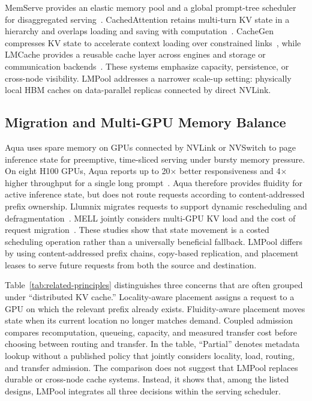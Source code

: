 \documentclass{article}
\newcommand{\sys}{LMPool}
\begin{document}
MemServe provides an elastic memory pool and a global prompt-tree scheduler for disaggregated serving~\citep{MemServe}. CachedAttention retains multi-turn KV state in a hierarchy and overlaps loading and saving with computation~\citep{CachedAttention}. CacheGen compresses KV state to accelerate context loading over constrained links~\citep{CacheGen}, while LMCache provides a reusable cache layer across engines and storage or communication backends~\citep{LMCache}. These systems emphasize capacity, persistence, or cross-node visibility. \sys{} addresses a narrower scale-up setting: physically local HBM caches on data-parallel replicas connected by direct NVLink.

\subsection{Migration and Multi-GPU Memory Balance}

Aqua uses spare memory on GPUs connected by NVLink or NVSwitch to page inference state for preemptive, time-sliced serving under bursty memory pressure. On eight H100 GPUs, Aqua reports up to 20$\times$ better responsiveness and 4$\times$ higher throughput for a single long prompt~\citep{Aqua}. Aqua therefore provides fluidity for active inference state, but does not route requests according to content-addressed prefix ownership. Llumnix migrates requests to support dynamic rescheduling and defragmentation~\citep{Llumnix}. MELL jointly considers multi-GPU KV load and the cost of request migration~\citep{MELL}. These studies show that state movement is a costed scheduling operation rather than a universally beneficial fallback. \sys{} differs by using content-addressed prefix chains, copy-based replication, and placement leases to serve future requests from both the source and destination.

Table~\ref{tab:related-principles} distinguishes three concerns that are often grouped under ``distributed KV cache.'' Locality-aware placement assigns a request to a GPU on which the relevant prefix already exists. Fluidity-aware placement moves state when its current location no longer matches demand. Coupled admission compares recomputation, queueing, capacity, and measured transfer cost before choosing between routing and transfer. In the table, ``Partial'' denotes metadata lookup without a published policy that jointly considers locality, load, routing, and transfer admission. The comparison does not suggest that \sys{} replaces durable or cross-node cache systems. Instead, it shows that, among the listed designs, \sys{} integrates all three decisions within the serving scheduler.
\end{document}
